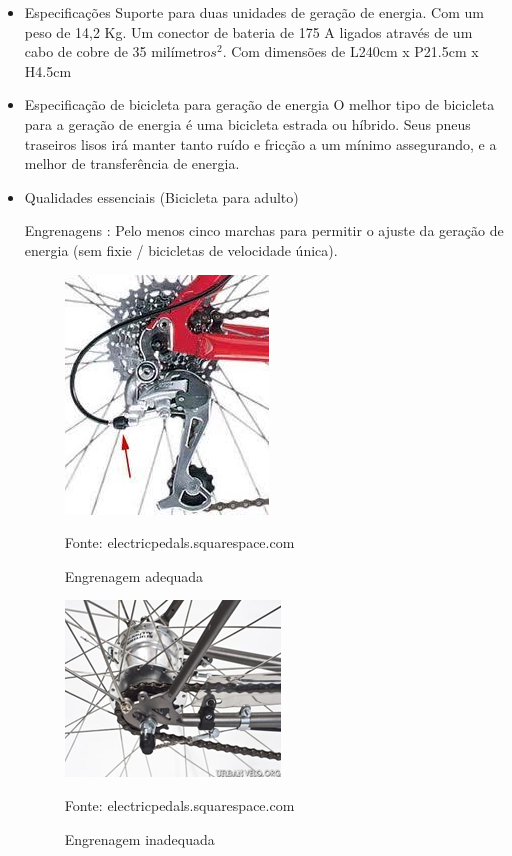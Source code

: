 \begin{itemize}
	\begin{itemize}
	\item Especificações
		Suporte para duas unidades de geração de energia. Com um peso de 14,2 Kg. Um conector de bateria de 175 A ligados através de um cabo de cobre de 35 milímetro$s^{2}$. Com dimensões de L240cm x P21.5cm x H4.5cm
	\end{itemize}	

	\begin{itemize}
	\item Especificação de bicicleta para geração de energia
		O melhor tipo de bicicleta para a geração de energia é uma bicicleta estrada ou híbrido. Seus pneus traseiros lisos irá manter tanto ruído e fricção a um mínimo assegurando, e a melhor de transferência de energia.
	\end{itemize}
	
	\begin{itemize}
		\item Qualidades essenciais (Bicicleta para adulto)
		
		Engrenagens : Pelo menos cinco marchas para permitir o ajuste da geração de energia (sem fixie / bicicletas de velocidade única).
	
	\begin{figure}[H]
	 \centering
	\label{Engrenagem adequada}
	 \includegraphics[keepaspectratio=true,scale=0.8]{interacao/12.png}
	 \caption{Engrenagem adequada}
	 \small{Fonte: electricpedals.squarespace.com}
	\end{figure}
	
	\begin{figure}[H]
	 \centering
	\label{Engrenagem inadequada}
	 \includegraphics[keepaspectratio=true,scale=0.8]{interacao/13.png}
	 \caption{Engrenagem inadequada}
	 \small{Fonte: electricpedals.squarespace.com}
	\end{figure}		
	

\end{itemize}
\end{itemize}
